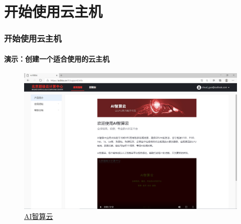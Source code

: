 \documentclass[10pt]{beamer}
\begin{document}
    \section{开始使用云主机}
        \begin{frame}
            \frametitle{开始使用云主机}
                \framesubtitle{演示：创建一个适合使用的云主机}

                \centering
                \begin{figure}
                    \href{https://ai.blsc.cn/}{
                        \includegraphics[width=\textwidth]{src/img/Welcome.png} \\
                        {\small AI智算云}
                        }
                \end{figure}

        \end{frame}
\end{document}
